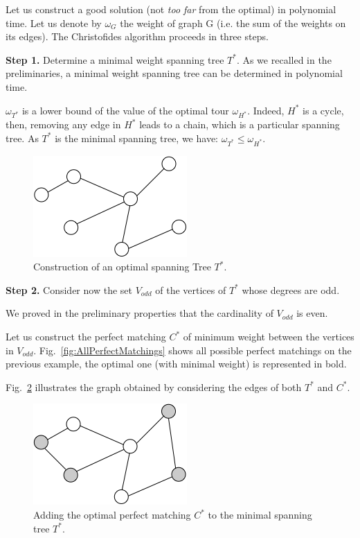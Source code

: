 Let us construct a good solution (not \textit{too far} from the optimal) in polynomial time. 
Let us denote by $\omega_G$ the weight of graph G (i.e. the sum of the weights on its edges). 
The Christofides algorithm proceeds in three steps. 
\bigskip

\textbf{Step 1.} Determine a minimal weight spanning tree $T^*$. 
As we recalled in the preliminaries, a minimal weight spanning tree can be determined in polynomial time. 
\bigskip

$\omega_{T^*}$ is a lower bound of the value of the optimal tour $\omega_{H^*}$. 
Indeed, $H^*$ is a cycle, then, removing any edge in $H^*$ leads to a chain, which is a particular spanning tree.
As $T^*$ is the minimal spanning tree, we have:
$\omega_{T^*} \leq \omega_{H^*}$.

\begin{figure}[hbt]
\begin{center}
       \includegraphics[scale=0.6]{FiguresGraph/christofides2}
       \caption{Construction of an optimal spanning Tree $T^*$.}
              \label{fig:christofidesSpanningTree}
\end{center}
\end{figure}


\textbf{Step 2.} Consider now the set $V_{odd}$ of the vertices of $T^*$ whose degrees are odd. 

We proved in the preliminary properties that the cardinality of $V_{odd}$ is even. 

Let us construct the perfect matching $C^*$ of minimum weight between the vertices in $V_{odd}$. 
Fig.~\ref{fig:AllPerfectMatchings} shows all possible perfect matchings on the previous example, the optimal one (with minimal weight) is represented in bold. 

Fig.~\ref{fig:christofidesPerfectMatching} illustrates the graph obtained by considering the edges of both $T^*$ and $C^*$. 
\begin{figure}[hbt]
\begin{center}
       \includegraphics[scale=0.6]{FiguresGraph/christofides3}
       \caption{Adding the optimal perfect matching $C^*$ to the minimal spanning tree $T^*$.}
              \label{fig:christofidesPerfectMatching}
\end{center}
\end{figure}

